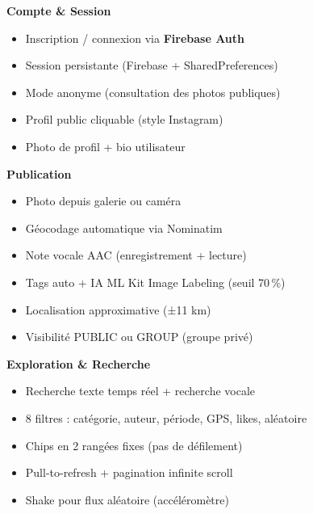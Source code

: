 \documentclass[a4paper,12pt,openany]{report}
\begin{document}
\vspace{6pt}
\begin{tcolorbox}[enhanced, colback=infobg, colframe=teal, arc=4pt,
  boxrule=0.6pt, left=8pt, right=8pt, top=6pt, bottom=6pt,
  title={\textbf{TravelShare — Réseau social de voyages}},
  fonttitle=\bfseries\small\color{white},
  colbacktitle=teal]

\begin{multicols}{2}
\small
\textbf{Compte \& Session}
\begin{itemize}[leftmargin=*,itemsep=0pt,topsep=2pt]
  \item Inscription / connexion via \textbf{Firebase Auth}
  \item Session persistante (Firebase + SharedPreferences)
  \item Mode anonyme (consultation des photos publiques)
  \item Profil public cliquable (style Instagram)
  \item Photo de profil + bio utilisateur
\end{itemize}

\textbf{Publication}
\begin{itemize}[leftmargin=*,itemsep=0pt,topsep=2pt]
  \item Photo depuis galerie ou caméra
  \item Géocodage automatique via Nominatim
  \item Note vocale AAC (enregistrement + lecture)
  \item Tags auto + IA ML Kit Image Labeling (seuil 70\,\%)
  \item Localisation approximative (±11 km)
  \item Visibilité PUBLIC ou GROUP (groupe privé)
\end{itemize}

\textbf{Exploration \& Recherche}
\begin{itemize}[leftmargin=*,itemsep=0pt,topsep=2pt]
  \item Recherche texte temps réel + recherche vocale
  \item 8 filtres : catégorie, auteur, période, GPS, likes, aléatoire
  \item Chips en 2 rangées fixes (pas de défilement)
  \item Pull-to-refresh + pagination infinite scroll
  \item Shake pour flux aléatoire (accéléromètre)
\end{itemize}


\end{multicols}
\end{tcolorbox}
\end{document}
